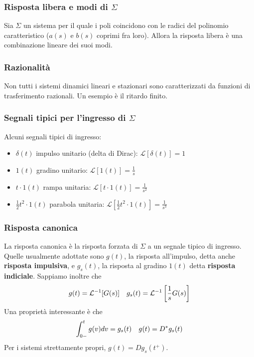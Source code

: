 \documentclass[11pt]{article}
\begin{document}
\subsubsection{Risposta libera e modi di $\Sigma$}
Sia $\Sigma$ un sistema per il quale i poli coincidono con le radici del polinomio caratteristico ($a(s)$ e $b(s)$ coprimi fra loro). Allora la risposta libera è una combinazione lineare dei suoi modi.
\subsubsection{Razionalità}
Non tutti i sistemi dinamici lineari e stazionari sono caratterizzati da funzioni di trasferimento razionali. Un esempio è il ritardo finito.
\subsubsection{Segnali tipici per l'ingresso di $\Sigma$}
Alcuni segnali tipici di ingresso:
\begin{itemize}
    \item $\delta(t)$ impulso unitario (delta di Dirac): $\mathcal{L}[\delta (t)] = 1$
    \item $1(t)$ gradino unitario: $\mathcal{L}[1(t)] = \frac{1}{s}$
    \item $t\cdot 1(t)$ rampa unitaria: $\mathcal{L}[t\cdot 1(t)] = \frac{1}{s^2}$
    \item $\frac{1}{2}t^2 \cdot 1(t)$ parabola unitaria: $\mathcal{L}\left[\frac{1}{2}t^2 \cdot 1(t)\right] = \frac{1}{s^3}$
\end{itemize}
\subsubsection{Risposta canonica}
La risposta canonica è la risposta forzata di $\Sigma$ a un segnale tipico di ingresso. Quelle usualmente adottate sono $g(t)$, la risposta all'impulso, detta anche \textbf{risposta impulsiva}, e $g_s(t)$, la risposta al gradino $1(t)$ detta \textbf{risposta indiciale}. Sappiamo inoltre che
\begin{displaymath}
    g(t) = \mathcal{L}^{-1}[G(s)] \hspace{10px} g_s(t) = \mathcal{L}^{-1}\left[\frac{1}{s}G(s)\right]
\end{displaymath}
Una proprietà interessante è che
\begin{displaymath}
    \int_{0-}^t g(v) dv = g_s(t) \hspace{10px} g(t)=D^* g_s (t)
\end{displaymath}
Per i sistemi strettamente propri, $g(t) = Dg_s(t^+)$.
\end{document}
